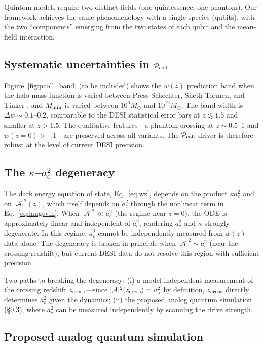 \documentclass[aps,prd,twocolumn,superscriptaddress]{revtex4-2}
\begin{document}
Quintom models \cite{Feng:2005} require two distinct fields (one quintessence, one phantom). Our framework achieves the same phenomenology with a single species (qubits), with the two ``components'' emerging from the two states of each qubit and the mean-field interaction.

\subsection{Systematic uncertainties in $\mathcal{P}_{\rm coll}$}

Figure~\ref{fig:pcoll_band} (to be included) shows the $w(z)$ prediction band when the halo mass function is varied between Press-Schechter, Sheth-Tormen, and Tinker \cite{Tinker:2008}, and $M_{\rm min}$ is varied between $10^6 M_\odot$ and $10^{12} M_\odot$. The band width is $\Delta w \sim 0.1$--$0.2$, comparable to the DESI statistical error bars at $z \lesssim 1.5$ and smaller at $z > 1.5$. The qualitative features---a phantom crossing at $z \sim 0.5$--$1$ and $w(z=0) > -1$---are preserved across all variants. The $\mathcal{P}_{\rm coll}$ driver is therefore robust at the level of current DESI precision.

\subsection{The $\kappa$--$a_c^2$ degeneracy}

The dark energy equation of state, Eq.~\eqref{eq:wz}, depends on the product $\kappa a_c^2$ and on $|\mathcal{A}|^2(z)$, which itself depends on $a_c^2$ through the nonlinear term in Eq.~\eqref{eq:langevin}. When $|\mathcal{A}|^2 \ll a_c^2$ (the regime near $z=0$), the ODE is approximately linear and independent of $a_c^2$, rendering $a_c^2$ and $\kappa$ strongly degenerate. In this regime, $a_c^2$ cannot be independently measured from $w(z)$ data alone. The degeneracy is broken in principle when $|\mathcal{A}|^2 \sim a_c^2$ (near the crossing redshift), but current DESI data do not resolve this region with sufficient precision.

Two paths to breaking the degeneracy: (i) a model-independent measurement of the crossing redshift $z_{\rm cross}$---since $|\mathcal{A}|^2(z_{\rm cross}) = a_c^2$ by definition, $z_{\rm cross}$ directly determines $a_c^2$ given the dynamics; (ii) the proposed analog quantum simulation (\S\ref{sec:quantumsim}), where $a_c^2$ can be measured independently by scanning the drive strength.

\subsection{Proposed analog quantum simulation}
\label{sec:quantumsim}
\end{document}
